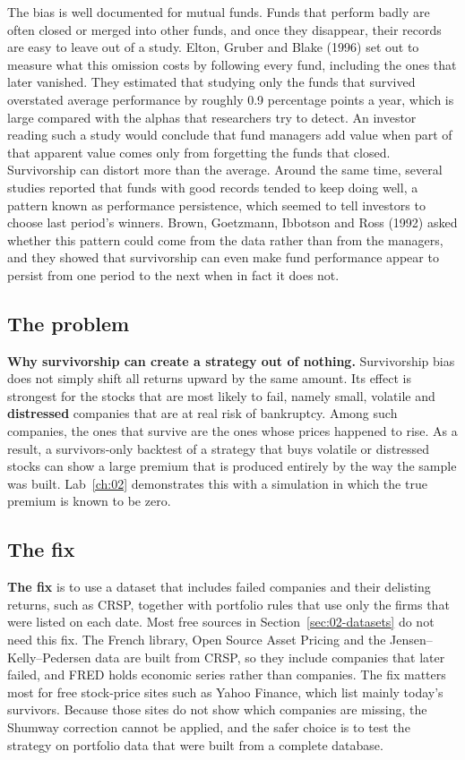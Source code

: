 The bias is well documented for mutual funds. Funds that perform badly are often closed or merged into other funds, and once they disappear, their records are easy to leave out of a study. Elton, Gruber and Blake (1996) set out to measure what this omission costs by following every fund, including the ones that later vanished. They estimated that studying only the funds that survived overstated average performance by roughly 0.9 percentage points a year, which is large compared with the alphas that researchers try to detect. An investor reading such a study would conclude that fund managers add value when part of that apparent value comes only from forgetting the funds that closed. Survivorship can distort more than the average. Around the same time, several studies reported that funds with good records tended to keep doing well, a pattern known as performance persistence, which seemed to tell investors to choose last period's winners. Brown, Goetzmann, Ibbotson and Ross (1992) asked whether this pattern could come from the data rather than from the managers, and they showed that survivorship can even make fund performance appear to persist from one period to the next when in fact it does not.

\subsection{The problem}

\textbf{Why survivorship can create a strategy out of nothing.} Survivorship bias does not simply shift all returns upward by the same amount. Its effect is strongest for the stocks that are most likely to fail, namely small, volatile and \textbf{distressed} companies that are at real risk of bankruptcy. Among such companies, the ones that survive are the ones whose prices happened to rise. As a result, a survivors-only backtest of a strategy that buys volatile or distressed stocks can show a large premium that is produced entirely by the way the sample was built. Lab~\ref{ch:02} demonstrates this with a simulation in which the true premium is known to be zero.

\subsection{The fix}

\textbf{The fix} is to use a dataset that includes failed companies and their delisting returns, such as CRSP, together with portfolio rules that use only the firms that were listed on each date. 
Most free sources in Section~\ref{sec:02-datasets} do not need this fix. The French library, Open Source Asset Pricing and the Jensen--Kelly--Pedersen data are built from CRSP, so they include companies that later failed, and FRED holds economic series rather than companies. The fix matters most for free stock-price sites such as Yahoo Finance, which list mainly today's survivors. Because those sites do not show which companies are missing, the Shumway correction cannot be applied, and the safer choice is to test the strategy on portfolio data that were built from a complete database.

